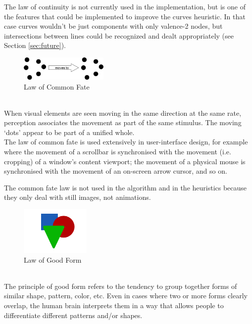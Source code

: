 \documentclass[]{usiinfbachelorproject}
\begin{document}
The law of continuity is not currently used in the implementation, but is one of the features that could be implemented to improve the curves heuristic. In that case curves wouldn't be just components with only valence-2 nodes, but intersections between lines could be recognized and dealt appropriately (see Section \ref{sec:future}).\\

\begin{figure}
	\centering
	\vspace{0.5cm}
	\includegraphics[width=0.38\textwidth]{img/gestalt_fate.jpeg}
	\caption*{Law of Common Fate}
\end{figure}

\\
When visual elements are seen moving in the same direction at the same rate, perception associates the movement as part of the same stimulus. The moving `dots' appear to be part of a unified whole.\\
The law of common fate is used extensively in user-interface design, for example where the movement of a scrollbar is synchronised with the movement (i.e. cropping) of a window's content viewport; the movement of a physical mouse is synchronised with the movement of an on-screen arrow cursor, and so on.

The common fate law is not used in the algorithm and in the heuristics because they only deal with still images, not animations.\\

\begin{figure}
	\centering
	\includegraphics[width=0.3\textwidth]{img/gestalt_pragnanz.png}
	\caption*{Law of Good Form}
\end{figure}

\\
The principle of good form refers to the tendency to group together forms of similar shape, pattern, color, etc. Even in cases where two or more forms clearly overlap, the human brain interprets them in a way that allows people to differentiate different patterns and/or shapes.
\end{document}

